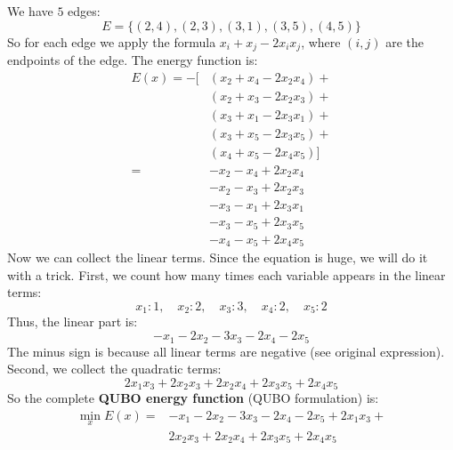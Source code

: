 \newpage

\noindent
{} We have $5$ edges:
\begin{equation*}
    E = \{(2,4), (2,3), (3,1), (3,5), (4,5)\}
\end{equation*}
So for each edge we apply the formula $x_i + x_j - 2 x_i x_j$, where $(i,j)$ are the endpoints of the edge. The energy function is:
\begin{align*}
    E(x) = -[&
        \left(x_2 + x_4 - 2 x_2 x_4\right) + \\[.3em]
        & \left(x_2 + x_3 - 2 x_2 x_3\right) + \\[.3em]
        & \left(x_3 + x_1 - 2 x_3 x_1\right) + \\[.3em]
        & \left(x_3 + x_5 - 2 x_3 x_5\right) + \\[.3em]
    & \left(x_4 + x_5 - 2 x_4 x_5\right) ] \\[.3em]
    =& -x_2 - x_4 + 2 x_2 x_4 \\[.3em]
    & - x_2 - x_3 + 2 x_2 x_3 \\[.3em]
    & - x_3 - x_1 + 2 x_3 x_1 \\[.3em]
    & - x_3 - x_5 + 2 x_3 x_5 \\[.3em]
    & - x_4 - x_5 + 2 x_4 x_5
\end{align*}
Now we can collect the linear terms. Since the equation is huge, we will do it with a trick. First, we count how many times each variable appears in the linear terms:
\begin{equation*}
    x_1: 1, \quad
    x_2: 2, \quad
    x_3: 3, \quad
    x_4: 2, \quad
    x_5: 2
\end{equation*}
Thus, the linear part is:
\begin{equation*}
    - x_1 - 2 x_2 - 3 x_3 - 2 x_4 - 2 x_5
\end{equation*}
The minus sign is because all linear terms are negative (see original expression). Second, we collect the quadratic terms:
\begin{equation*}
    2 x_1 x_3 +
    2 x_2 x_3 +
    2 x_2 x_4 +
    2 x_3 x_5 +
    2 x_4 x_5
\end{equation*}
So the complete \textbf{QUBO energy function} (QUBO formulation) is:
\begin{equation*}
    \boxed{
        \begin{aligned}
            \min_{x} E(x) = &- x_1 - 2 x_2 - 3 x_3 - 2 x_4 - 2 x_5 + 2 x_1 x_3 + \\
            &2 x_2 x_3 +
            2 x_2 x_4 +
            2 x_3 x_5 +
            2 x_4 x_5
        \end{aligned}
    }
\end{equation*}

